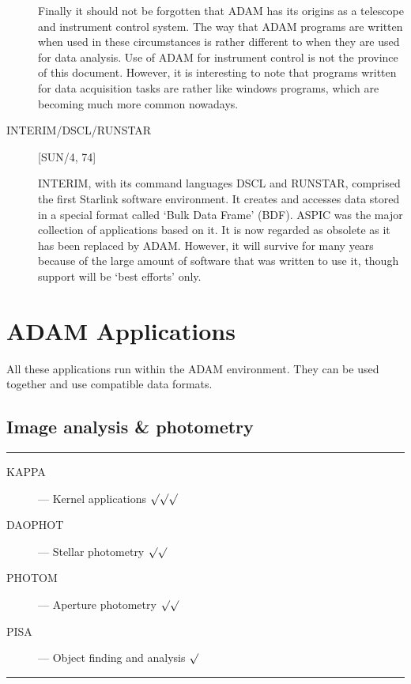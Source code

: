 \begin{description}
Finally it should not be forgotten that ADAM has its origins as a telescope and
instrument control system.
The way that ADAM programs are written when used in these circumstances is
rather different to when they are used for data analysis.
Use of ADAM for instrument control is not the province of this document.
However, it is interesting to note that programs written for data acquisition
tasks are rather like windows programs, which are becoming much more common
nowadays.

\item [INTERIM/DSCL/RUNSTAR]
 \hfill [SUN/4, 74]

INTERIM, with its command languages DSCL and RUNSTAR, comprised the first
Starlink software environment.
It creates and accesses data stored in a special format called `Bulk Data
Frame' (BDF).
ASPIC was the major collection of applications based on it.
It is now regarded as obsolete as it has been replaced by ADAM.
However, it will survive for many years because of the large amount of
software that was written to use it, though support will be `best efforts'
only.

\end{description}

\newpage

\section {ADAM Applications}

All these applications run within the ADAM environment.
They can be used together and use compatible data formats.

\subsection{Image analysis \& photometry}

\rule{\textwidth}{0.5mm}
\begin{description}
\begin{description}
\item [KAPPA] --- Kernel applications \hfill $\surd\surd\surd$
\item [DAOPHOT] --- Stellar photometry \hfill $\surd\surd$
\item [PHOTOM] --- Aperture photometry \hfill $\surd\surd$
\item [PISA] --- Object finding and analysis \hfill $\surd$
\end{description}
\end{description}
\rule{\textwidth}{0.5mm}

